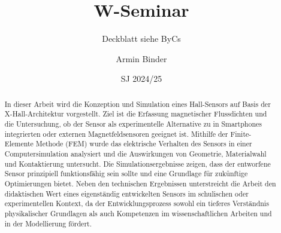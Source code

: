 \documentclass[12pt, a4paper]{article}
\title{W-Seminar}
\subtitle{Deckblatt siehe ByCs}
\author{Armin Binder }
\date{SJ 2024/25}
\begin{document}
\pagestyle{fancy}
\fancyhf{} 
\fancyfoot[C]{\thepage}

\thispagestyle{empty}
\pagebreak

\begin{abstract}
	In dieser Arbeit wird die Konzeption und Simulation eines Hall-Sensors auf Basis der X-Hall-Architektur vorgestellt. Ziel ist die Erfassung magnetischer Flussdichten und die Untersuchung, ob der Sensor als experimentelle Alternative zu in Smartphones integrierten oder externen Magnetfeldsensoren geeignet ist. Mithilfe der Finite-Elemente Methode (FEM) wurde das elektrische Verhalten des Sensors in einer Computersimulation analysiert und die Auswirkungen von Geometrie, Materialwahl und Kontaktierung untersucht. Die Simulationsergebnisse zeigen, dass der entworfene Sensor prinzipiell funktionsfähig sein sollte und eine Grundlage für zukünftige Optimierungen bietet. Neben den technischen Ergebnissen unterstreicht die Arbeit den didaktischen Wert eines eigenständig entwickelten Sensors im schulischen oder experimentellen Kontext, da der Entwicklungsprozess sowohl ein tieferes Verständnis physikalischer Grundlagen als auch Kompetenzen im wissenschaftlichen Arbeiten und in der Modellierung fördert.
\end{abstract}
\thispagestyle{empty}
\end{document}
